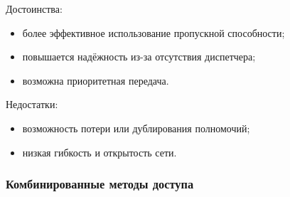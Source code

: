 \documentclass[12pt, russian, oneside, article]{ncc}
\begin{document}
\begin{itemize}
Достоинства:
\begin{itemize}
\item более эффективное использование пропускной способности;
\item повышается надёжность из-за отсутствия диспетчера;
\item возможна приоритетная передача.
\end{itemize}

Недостатки:
\begin{itemize}
\item возможность потери или дублирования полномочий;
\item низкая гибкость и открытость сети.
\end{itemize}

\end{itemize} %
\subsubsection{Комбинированные методы доступа}
\label{sec-5_1_3}
\end{document}

